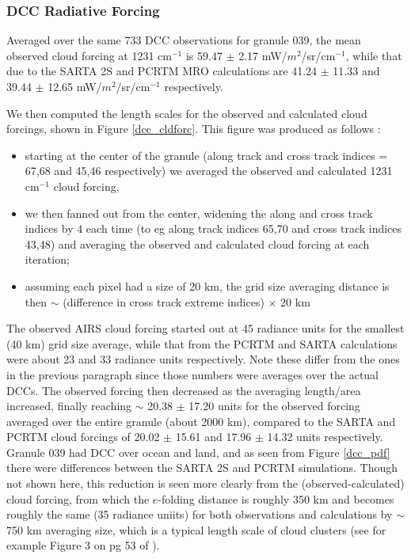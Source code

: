 \documentclass[agupp]{aguplus}              %
\newcommand{\wn}{cm$^{-1}$\xspace}
\begin{document}
\begin{article}
\subsubsection{DCC Radiative Forcing}

Averaged over the same 733 DCC observations for granule 039,
the mean observed cloud forcing at 1231 \wn is 59.47 $\pm$ 2.17
mW/$m^2$/sr/\wn, while that due to the SARTA 2S and PCRTM MRO
calculations are 41.24 $\pm$ 11.33 and 39.44 $\pm$ 12.65 mW/$m^2$/sr/\wn
respectively.

We then computed the length scales for the observed and calculated cloud 
forcings, shown in Figure \ref{dcc_cldforc}. This figure was produced as follows : 
\begin{itemize}
  \item starting at the center of the  granule (along track and cross track indices = 67,68 and
        45,46 respectively) we averaged the observed and calculated 1231 \wn cloud forcing,
  \item we then fanned out from the center, widening the along and cross track indices by 4 each time 
        (to eg along track indices 65,70 and cross track indices 43,48) and averaging the
        observed and calculated cloud forcing at each iteration;
  \item assuming each pixel had a size of 20 km, the grid size averaging distance is then $\sim$ (difference 
        in cross track extreme indices) $\times$ 20 km
\end{itemize}

The observed AIRS cloud forcing started out at 45 radiance units for
the smallest (40 km) grid size average, while that from the PCRTM and
SARTA calculations were about 23 and 33 radiance units respectively.
Note these differ from the ones in the previous paragraph since those
numbers were averages over the actual DCCs.  The observed forcing then
decreased as the averaging length/area increased, finally reaching
$\sim$ 20.38 $\pm$ 17.20 units for the observed forcing averaged over
the entire granule (about 2000 km), compared to the SARTA and PCRTM
cloud forcings of 20.02 $\pm$ 15.61 and 17.96 $\pm$ 14.32 units
respectively.  Granule 039 had DCC over ocean and land, and as seen
from Figure \ref{dcc_pdf} there were differences between the SARTA 2S
and PCRTM simulations. Though not shown here, this reduction is seen
more clearly from the (observed-calculated) cloud forcing, from which
the $e$-folding distance is roughly 350 km and becomes roughly the same (35
radiance uniits) for both observations and calculations by $\sim$ 750
km averaging size, which is a typical length scale of cloud clusters
(see for example Figure 3 on pg 53 of \cite{vonStorch:99}).


\end{article}
\end{document}
